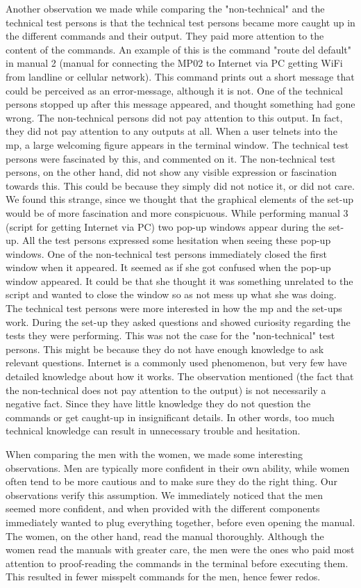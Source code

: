 Another observation we made while comparing the "non-technical" and the technical test persons is that the technical test persons became more caught up in the different commands and their output. They paid more attention to the content of the commands. An example of this is the command "route del default" in manual 2 (manual for connecting the MP02 to Internet via PC getting WiFi from landline or cellular network). This command prints out a short message that could be perceived as an error-message, although it is not. One of the technical persons stopped up after this message appeared, and thought something had gone wrong. The non-technical persons did not pay attention to this output. In fact, they did not pay attention to any outputs at all. When a user telnets into the \gls{mp}, a large welcoming figure appears in the terminal window. The technical test persons were fascinated by this, and commented on it. The non-technical test persons, on the other hand, did not show any visible expression or fascination towards this. This could be because they simply did not notice it, or did not care. We found this strange, since we thought that the graphical elements of the set-up would be of more fascination and more conspicuous. While performing manual 3 (script for getting Internet via PC) two pop-up windows appear during the set-up. All the test persons expressed some hesitation when seeing these pop-up windows. One of the non-technical test persons immediately closed the first window when it appeared. It seemed as if she got confused when the pop-up window appeared. It could be that she thought it was something unrelated to the script and wanted to close the window so as not mess up what she was doing. The technical test persons were more interested in how the \gls{mp} and the set-ups work. During the set-up they asked questions and showed curiosity regarding the tests they were performing. This was not the case for the "non-technical" test persons. This might be because they do not have enough knowledge to ask relevant questions. Internet is a commonly used phenomenon, but very few have detailed knowledge about how it works. The observation mentioned (the fact that the non-technical does not pay attention to the output) is not necessarily a negative fact. Since they have little knowledge they do not question the commands or get caught-up in insignificant details. In other words, too much technical knowledge can result in unnecessary trouble and hesitation. 

When comparing the men with the women, we made some interesting observations. Men are typically more confident in their own ability, while women often tend to be more cautious and to make sure they do the right thing. Our observations verify this assumption. We immediately noticed that the men seemed more confident, and when provided with the different components immediately wanted to plug everything together, before even opening the manual. The women, on the other hand, read the manual thoroughly. Although the women read the manuals with greater care, the men were the ones who paid most attention to proof-reading the commands in the terminal before executing them. This resulted in fewer misspelt commands for the men, hence fewer redos. 
